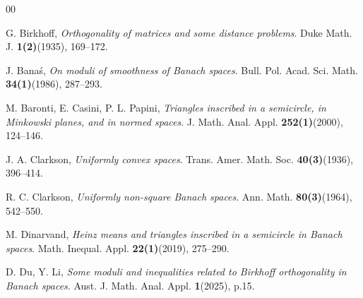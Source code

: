 \documentclass[preprint,12pt]{elsarticle}
\numberwithin{equation}{section}
\begin{document}




\begin{thebibliography}{00}


  G. Birkhoff, \textit{Orthogonality of matrices and some distance problems}. Duke Math. J. \textbf{1(2)}(1935), 169--172.

  J. Bana{\'s}, \textit{On moduli of smoothness of Banach spaces}. Bull. Pol. Acad. Sci. Math. \textbf{34(1)}(1986),  287–293.


  M. Baronti, E. Casini, P. L. Papini, \textit{Triangles inscribed in a semicircle, in Minkowski planes, and in normed spaces}. J. Math. Anal. Appl.  \textbf{252(1)}(2000), 124--146.




 J. A. Clarkson, \textit{Uniformly convex spaces}. Trans. Amer. Math. Soc. \textbf{40(3)}(1936), 396--414.

 R. C. Clarkson, \textit{Uniformly non-square Banach spaces}. Ann. Math. \textbf{80(3)}(1964), 542--550.

 M.  Dinarvand, \textit{Heinz means and triangles inscribed in a semicircle in Banach spaces}. Math. Inequal. Appl. \textbf{22(1)}(2019), 275--290.


 D. Du,  Y. Li, \textit{Some moduli and inequalities related to Birkhoff orthogonality in Banach spaces}. Aust. J. Math. Anal. Appl. \textbf{1}(2025), p.15.



\end{thebibliography}
\end{document}
